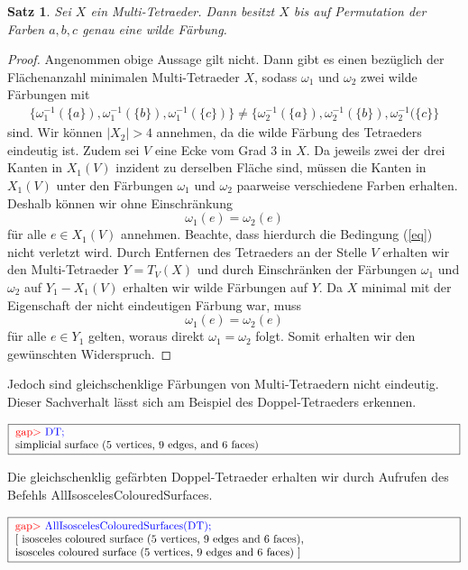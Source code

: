 \documentclass[12pt,titlepage,twoside,cleardoublepage]{article}
\theoremstyle{nummermitklammern}
\newtheorem{satz}[temp]{Satz}
\newtheorem{satz}[zahl]{Satz}
\numberwithin{equation}{section}
\begin{document}
\begin{satz}
Sei $X$ ein Multi-Tetraeder. Dann besitzt $X$ bis auf Permutation der Farben $a,b,c$ genau eine wilde Färbung.
\end{satz}
\begin{proof}
Angenommen obige Aussage gilt nicht. Dann gibt es einen bezüglich der Flächenanzahl minimalen Multi-Tetraeder $X$, sodass $\omega_1$ und $\omega_2$ zwei wilde Färbungen mit 
\begin{align} \label{eq}
\{\omega_1^{-1}(\{a\}),\omega_1^{-1}(\{b\}),\omega_1^{-1}(\{c\})\}\neq \{\omega_2^{-1}(\{a\}),\omega_2^{-1}(\{b\}),\omega_2^{-1}(\{c\}\}
\end{align}
sind. Wir können $\vert X_2\vert >4$ annehmen, da die wilde Färbung des Tetraeders eindeutig ist. Zudem sei $V$ eine Ecke vom Grad 3 in $X.$ Da jeweils zwei der drei Kanten in $X_1(V)$ inzident zu derselben Fläche sind, müssen die Kanten in $X_1(V)$ unter den Färbungen $\omega_1$ und $\omega_2$ paarweise verschiedene Farben erhalten. Deshalb können wir ohne Einschränkung 
\[
\omega_1(e)=\omega_2(e)
\] 
für alle $e\in X_1(V)$ annehmen. Beachte, dass hierdurch die Bedingung (\ref{eq}) nicht verletzt wird. Durch Entfernen des Tetraeders an der Stelle $V$ erhalten wir den Multi-Tetraeder $Y=T_V(X)$ und durch Einschränken der Färbungen $\omega_1$ und $\omega_2$ auf $Y_1-X_1(V)$ erhalten wir wilde Färbungen auf $Y$. Da $X$ minimal mit der Eigenschaft der nicht eindeutigen Färbung war, muss
\[
\omega_1(e)=\omega_2(e)
\]
für alle $e\in Y_1$ gelten, woraus direkt $\omega_1=\omega_2$ folgt. Somit erhalten wir den gewünschten Widerspruch.
\end{proof}
Jedoch sind gleichschenklige Färbungen von Multi-Tetraedern nicht eindeutig. Dieser Sachverhalt lässt sich am Beispiel des Doppel-Tetraeders erkennen.
\begin{center}
$\fbox{
\parbox{14cm}{
\textcolor{red}{gap$>$} \textcolor{blue}{ DT;}\\
simplicial surface (5 vertices, 9 edges, and 6 faces)
}}$
\end{center}
Die gleichschenklig gefärbten Doppel-Tetraeder erhalten wir durch Aufrufen des Befehls 
\textsf{AllIsoscelesColouredSurfaces}.
\begin{center}
$\fbox{
\parbox{14cm}{
\textcolor{red}{gap$>$} \textcolor{blue}{AllIsoscelesColouredSurfaces(DT);}\newline
[ isosceles coloured surface (5 vertices, 9 edges and 6 faces),\newline
  isosceles coloured surface (5 vertices, 9 edges and 6 faces) ]
}}$
\end{center}
\end{document}
